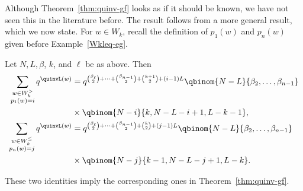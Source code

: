 Although Theorem~\ref{thm:quinv-gf} looks as if it should be known, we have not seen this in the literature before. The result follows from a more general result, which we now state. 
For $w \in W_k$, recall the definition of $p_1(w)$ and $p_n(w)$ given before Example~\ref{Wkleq-eg}.

\begin{theorem}
\label{thm:quinv-refined-gf}
Let $N, L, \beta$, $k$, and $\ell$ be as above. 
Then
\begin{align}
\label{quinv-ref-gf>}
\sum_{\substack{ w \in W_k^> \\ p_1(w) = i}} q^{\quinvL(w)} &= q^{\binom{\beta_\ell}{2} + \cdots + \binom{\beta_{n-1}}{2} + \binom{k+1}{2} + (i-1)L} 
\qbinom{N-L}{\beta_2,\dots,\beta_{n-1}} \cr 
& \times \qbinom{N-i}{k, N-L-i+1, L-k-1}, \\
\label{quinv-ref-gf<}
\sum_{\substack{ w \in W_k^\leq \\ p_n(w) = j}} q^{\quinvL(w)} &= q^{\binom{\beta_\ell}{2} + \cdots + \binom{\beta_{n-1}}{2}+\binom{k}{2} + (j-1) L} 
\qbinom{N-L}{\beta_2,\dots,\beta_{n-1}} \cr 
& \times \qbinom{N-j}{k-1, N-L-j+1, L-k}.
\end{align} \end{theorem}

These two identities imply the corresponding ones in Theorem~\ref{thm:quinv-gf}.

